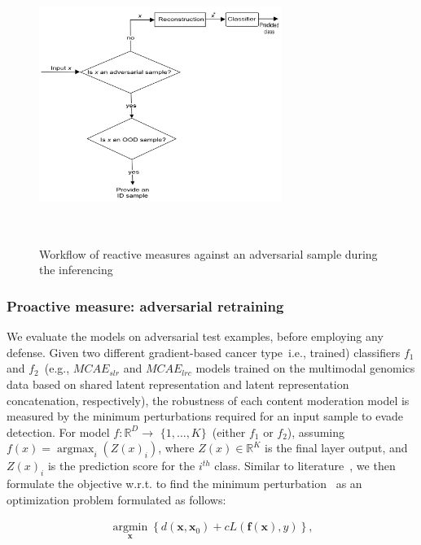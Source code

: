 \begin{figure}[htp!]
    \centering
    \includegraphics[width=0.7\textwidth,height=90mm]{images/reactive_measure.png}
    \caption{Workflow of reactive measures against an adversarial sample during the inferencing}
    \label{fig:reactive_measures}
    \vspace{-4mm}
\end{figure}

\subsubsection{Proactive measure: adversarial retraining}
We evaluate the models on adversarial test examples, before employing any defense. Given two different gradient-based cancer type~i.e., trained) classifiers $f_1$ and $f_2$~(e.g., $MCAE_{slr}$ and $MCAE_{lrc}$ models trained on the multimodal genomics data based on shared latent representation and latent representation concatenation, respectively), the robustness of each content moderation model is measured by the minimum perturbations required for an input sample to evade detection. For model $f: \mathbb{R}^{D} \rightarrow$ $\{1, \ldots, K\}$~(either $f_1$ or $f_2$), assuming $f(x)=\operatorname{argmax}_{i}\left(Z(x)_{i}\right)$, where $Z(x) \in\mathbb{R}^{K}$ is the final layer output, and $Z(x)_{i}$ is the prediction score for the $i^{th}$ class. Similar to literature~\cite{bhatt2020explainable}, we then formulate the objective w.r.t. to find the minimum perturbation~\cite{bhatt2020explainable} as an optimization problem formulated as follows:

\vspace{-6mm}
\begin{align}
    \underset{\boldsymbol{x}}{\operatorname{argmin}}\left\{d\left(\boldsymbol{x}, \boldsymbol{x}_{0}\right)+c {L}(\boldsymbol{f}(\boldsymbol{x}), y)\right\},
\end{align}

